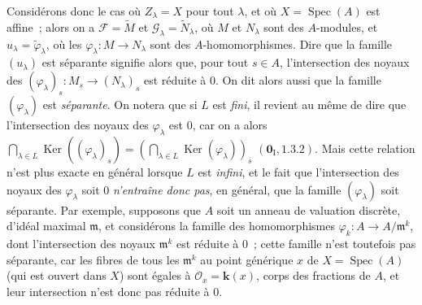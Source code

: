 \begin{env}[11.9.4]
\label{IV.11.9.4-fr}
Considérons donc le cas où $Z_\lambda=X$ pour tout $\lambda$, et où
$X=\operatorname{Spec}(A)$ est affine~; alors on a
$\mathcal F=\widetilde M$ et $\mathcal G_\lambda=\widetilde N_\lambda$, où
$M$ et $N_\lambda$ sont des $A$-modules, et $u_\lambda=\widetilde\varphi_\lambda$,
où les $\varphi_\lambda:M\to N_\lambda$ sont des $A$-homomorphismes. Dire que
la famille $(u_\lambda)$ est séparante signifie alors que, pour tout $s\in A$,
l'intersection des noyaux des
$(\varphi_\lambda)_s:M_s\to(N_\lambda)_s$ est réduite à 0. On dit alors aussi
que la famille $(\varphi_\lambda)$ est \emph{séparante}. On notera que si $L$
est \emph{fini}, il revient au même de dire que l'intersection des noyaux des
$\varphi_\lambda$ est 0, car on a alors
$\bigcap_{\lambda\in L}\operatorname{Ker}((\varphi_\lambda)_s)
=(\bigcap_{\lambda\in L}\operatorname{Ker}(\varphi_\lambda))_s$
$(\mathbf 0_{\mathrm I},1.3.2)$.
Mais cette relation n'est plus exacte en général lorsque $L$ est \emph{infini},
et le fait que l'intersection des noyaux des $\varphi_\lambda$ soit 0
\emph{n'entraîne donc pas},
en général, que la famille $(\varphi_\lambda)$ soit séparante. Par exemple,
supposons que $A$ soit un anneau de valuation discrète, d'idéal maximal
$\mathfrak m$, et considérons la famille des homomorphismes
$\varphi_k:A\to A/\mathfrak m^k$, dont l'intersection des noyaux
$\mathfrak m^k$ est réduite à 0~; cette famille n'est toutefois pas séparante,
car les fibres de tous les $\mathfrak m^k$ au point générique $x$ de
$X=\operatorname{Spec}(A)$ (qui est ouvert dans $X$) sont égales à
$\mathcal O_x=\boldsymbol{k}(x)$, corps des fractions de $A$, et leur intersection n'est
donc pas réduite à 0.
\end{env}


